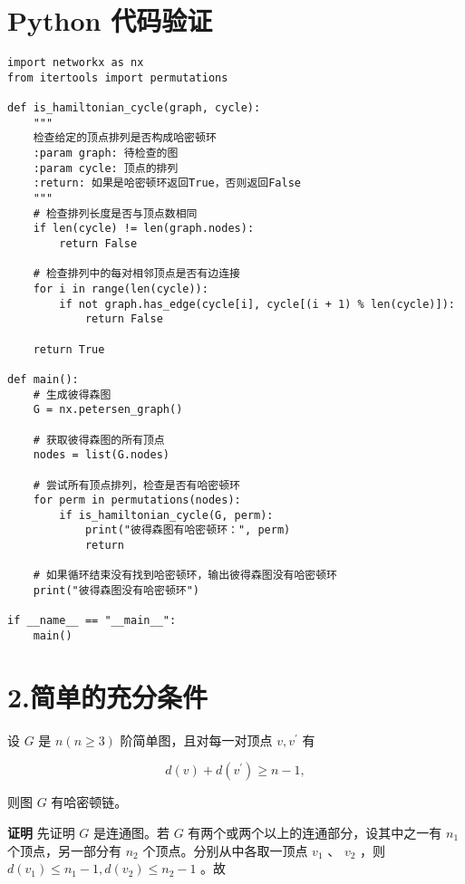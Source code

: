 \documentclass{article}
\begin{document}
\newpage

\section*{Python 代码验证}

\begin{lstlisting}
import networkx as nx
from itertools import permutations

def is_hamiltonian_cycle(graph, cycle):
    """
    检查给定的顶点排列是否构成哈密顿环
    :param graph: 待检查的图
    :param cycle: 顶点的排列
    :return: 如果是哈密顿环返回True，否则返回False
    """
    # 检查排列长度是否与顶点数相同
    if len(cycle) != len(graph.nodes):
        return False
    
    # 检查排列中的每对相邻顶点是否有边连接
    for i in range(len(cycle)):
        if not graph.has_edge(cycle[i], cycle[(i + 1) % len(cycle)]):
            return False
    
    return True

def main():
    # 生成彼得森图
    G = nx.petersen_graph()
    
    # 获取彼得森图的所有顶点
    nodes = list(G.nodes)
    
    # 尝试所有顶点排列，检查是否有哈密顿环
    for perm in permutations(nodes):
        if is_hamiltonian_cycle(G, perm):
            print("彼得森图有哈密顿环：", perm)
            return
    
    # 如果循环结束没有找到哈密顿环，输出彼得森图没有哈密顿环
    print("彼得森图没有哈密顿环")

if __name__ == "__main__":
    main()
\end{lstlisting}

\newpage

\section*{2.简单的充分条件}

设 $G$ 是 $n(n \geqslant 3)$ 阶简单图，且对每一对顶点 $v, v^{\prime}$ 有

\[ d(v) + d\left(v^{\prime}\right) \geqslant n - 1, \]

则图 $G$ 有哈密顿链。

\textbf{证明} 先证明 $G$ 是连通图。若 $G$ 有两个或两个以上的连通部分，设其中之一有 $n_{1}$ 个顶点，另一部分有 $n_{2}$ 个顶点。分别从中各取一顶点 $v_{1}$ 、 $v_{2}$ ，则 $d\left(v_{1}\right) \leqslant n_{1} - 1, d\left(v_{2}\right) \leqslant n_{2} - 1$ 。故
\end{document}
